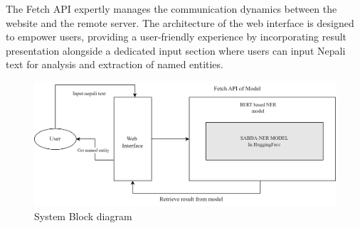 The Fetch API expertly manages the communication dynamics between the website and the remote server. The architecture of the web interface is designed to empower users, providing a user-friendly experience by incorporating result presentation alongside a dedicated input section where users can input Nepali text for analysis and extraction of named entities.
 \begin{figure}[H]
\centering
\includegraphics[scale=0.8]{img/systemBlock-etc/_NERsystemArchitecture.png}
\caption[ System Block diagram]{ System Block diagram}

\end{figure}







